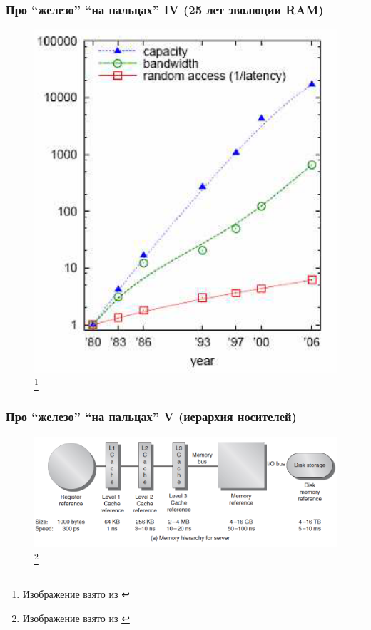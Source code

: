 \documentclass{beamer}
\begin{document}
\begin{frame}
\frametitle{Про ``железо'' ``на пальцах'' IV (25 лет эволюции RAM)}

\begin{figure}[htb]
\includegraphics[width=\textwidth,height=0.80\textheight,keepaspectratio]{dram.png} 
\footnote{\tiny{Изображение взято из \cite{Harizopoulos2009}}}
\end{figure}    
  
\end{frame}

\begin{frame}
\frametitle{Про ``железо'' ``на пальцах'' V (иерархия носителей)}

\begin{figure}[htb]
\includegraphics[width=\textwidth,height=0.750\textheight,keepaspectratio]{memoryhierarchy2.png} 
\footnote{\tiny{Изображение взято из \cite{Hennessy2011}}}
\end{figure}    
  
\end{frame}
\end{document}
